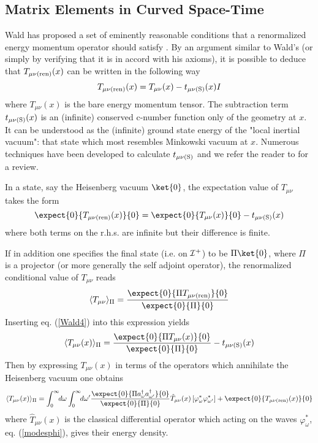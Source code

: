 \documentclass[12pt]{article}
\begin{document}
\subsection{Matrix Elements in Curved Space-Time}

Wald has proposed a set of eminently reasonable
conditions that a renormalized energy
momentum operator should satisfy \cite{wald}.
By an argument  similar to
Wald's (or
simply by verifying that it is in accord with his axioms), it is
 possible to deduce that  $T_{\mu \nu ({\rm ren})} (x)$ can
be
written in the following way
\begin{equation}
T_{\mu \nu ({\rm ren})} (x) =
T_{\mu \nu} (x) - t_{\mu \nu ({\rm S})} (x) I
\label{Wald4}
\end{equation}
where $T_{\mu
\nu} (x)$ is the bare energy momentum tensor.  The subtraction term  $t_{\mu
\nu ({\rm S})} (x)$ is an (infinite) conserved c-number function only of the
geometry at $x$. It can be understood\cite{mpblocal,mas}
as the (infinite) ground state
energy of the "local inertial vacuum": that state which most resembles
Minkowski vacuum at $x$. Numerous techniques have been
developed
to
calculate $t_{\mu \nu ({\rm S})}$ and we refer the reader to
\cite{birreld}
for a
review.

In a state, say the Heisenberg vacuum
$\ket{0}$, the expectation value of $T_{\mu\nu}$
 takes the form
\begin{equation}
 \expect{0}{T_{\mu \nu
({\rm ren})} (x)}{0} = \expect{0}{T_{\mu \nu } (x)}{0} -  t_{\mu \nu
({\rm S})} (x)
\label{beware}
\end{equation}
 where both terms on the r.h.s. are infinite but
their difference is finite.

If in addition one specifies the final state (i.e. on $\cal{I}^+$)
to be $\Pi \ket{0}$, where
$\Pi$ is a projector (or more generally the self
adjoint operator), the renormalized conditional value of $T_{\mu \nu}$
reads
\begin{equation}
\langle T_{\mu \nu } \rangle_\Pi = {
\expect{0}{\Pi T_{\mu \nu ({\rm ren})} } {0} \over  \expect{0}{\Pi }
{0} }
 \label{bh11}
\end{equation}
 Inserting eq. (\ref{Wald4})
 into this
expression yields
 \begin{equation}
\langle T_{\mu \nu }(x)\rangle_{\Pi} = {
\expect{0}{\Pi {T_{\mu \nu }}(x) } {0} \over  \expect{0}{\Pi } {0} } -
t_{\mu \nu ({\rm S})}(x)
\label{bh12}
\end{equation}
Then by expressing ${T_{\mu \nu }}(x)$ in terms of the operators which
annihilate the Heisenberg vacuum one obtains
\begin{equation}
\langle T_{\mu \nu }(x)\rangle_{\Pi}  = \int_0^\infty\!\! d \omega
\int_0^\infty\!\! d \omega^{\prime} {
\expect{0}{\Pi a_{\omega}^{\dagger} a_{\omega^{\prime}}^{\dagger}
 } {0} \over  \expect{0}{\Pi } {0} } \hat T_{\mu \nu }
(x)\left[ \varphi^*_\omega \varphi^*_{\omega^{\prime}}
\right] +
\expect{0}{T_{\mu \nu
({\rm ren})} (x)}{0}
\label{2terms}
\end{equation}
where $ \hat T_{\mu \nu } (x)$
is the classical differential operator
which acting on the waves $ \varphi^*_\omega$, eq. (\ref{modesphi}),
 gives their energy
density.
\end{document}

